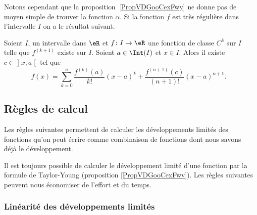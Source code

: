 Notons cependant que la proposition~\ref{PropVDGooCexFwy} ne donne pas de moyen simple de trouver la fonction \( \alpha\). Si la fonction \( f\) est très régulière dans l'intervalle \( I\) on a le résultat suivant.
\begin{proposition}     \label{PropResteTaylorc}
	Soient \( I\), un intervalle dans \( \eR\) et \( f\colon I\to \eR\) une fonction de classe \( C^k\) sur \( I\) telle que \( f^{(k+1)}\) existe sur \( I\). Soient \( a\in\Int(I)\) et \( x\in I\). Alors il existe \( c\in\mathopen] x , a \mathclose[\) tel que
	\begin{equation}
		f(x)=\sum_{k=0}^n\frac{ f^{(k)}(a) }{ k! }(x-a)^k+\frac{ f^{(n+1)}(c) }{ (n+1)! }(x-a)^{n+1}.
	\end{equation}
\end{proposition}

\subsection{Règles de calcul}

Les règles suivantes permettent de calculer les développements limités des fonctions qu'on peut écrire comme combinaison de fonctions dont nous savons déjà le développement.

Il est toujours possible de calculer le développement limité d'une fonction par la formule de Taylor-Young (proposition \ref{PropVDGooCexFwy}). Les règles suivantes peuvent nous économiser de l'effort et du temps.

\subsubsection{Linéarité des développements limités}

